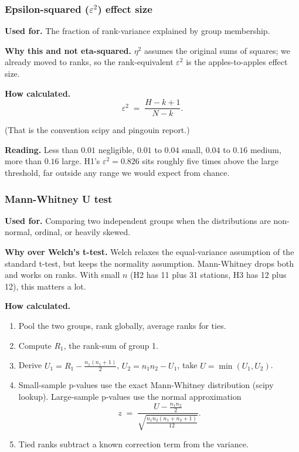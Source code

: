 \subsubsection{Epsilon-squared \texorpdfstring{($\varepsilon^2$)}{} effect size}

\textbf{Used for.} The fraction of rank-variance explained by group
membership.

\textbf{Why this and not eta-squared.} $\eta^2$ assumes the original
sums of squares; we already moved to ranks, so the rank-equivalent
$\varepsilon^2$ is the apples-to-apples effect size.

\textbf{How calculated.}
\begin{equation*}
  \varepsilon^2 \;=\; \frac{H - k + 1}{N - k}.
\end{equation*}

(That is the convention scipy and pingouin report.)

\textbf{Reading.} Less than $0.01$ negligible, $0.01$ to $0.04$ small,
$0.04$ to $0.16$ medium, more than $0.16$ large. H1's
$\varepsilon^2 = 0.826$ sits roughly five times above the large
threshold, far outside any range we would expect from chance.

\subsubsection{Mann-Whitney U test}

\textbf{Used for.} Comparing two independent groups when the
distributions are non-normal, ordinal, or heavily skewed.

\textbf{Why over Welch's t-test.} Welch relaxes the equal-variance
assumption of the standard t-test, but keeps the normality assumption.
Mann-Whitney drops both and works on ranks. With small $n$ (H2 has
11 plus 31 stations, H3 has 12 plus 12), this matters a lot.

\textbf{How calculated.}

\begin{enumerate}
  \item Pool the two groups, rank globally, average ranks for ties.
  \item Compute $R_1$, the rank-sum of group 1.
  \item Derive $U_1 = R_1 - \tfrac{n_1(n_1+1)}{2}$,
        $U_2 = n_1 n_2 - U_1$, take $U = \min(U_1, U_2)$.
  \item Small-sample p-values use the exact Mann-Whitney distribution
        (scipy lookup). Large-sample p-values use the normal
        approximation
        \begin{equation*}
          z \;=\; \frac{U - \tfrac{n_1 n_2}{2}}
                       {\sqrt{\tfrac{n_1 n_2 (n_1+n_2+1)}{12}}}.
        \end{equation*}
  \item Tied ranks subtract a known correction term from the variance.
\end{enumerate}

